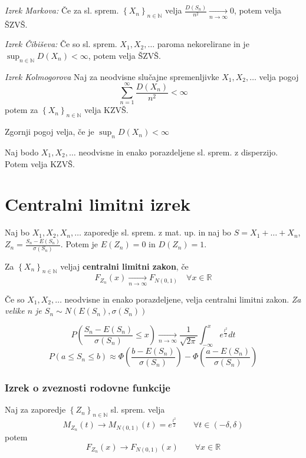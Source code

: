 \begin{multicols}{5}
\textit{Izrek Markova:}
Če za sl. sprem. $\left\{ X_n \right\}_{n \in \mathbb{N}} $ velja $\frac{D(S_n)}{n^2} \xrightarrow[n \to \infty]{} 0$, potem velja ŠZVŠ.

\textit{Izrek Čibiševa:}
Če so sl. sprem. $ X_1, X_2, \dots $ paroma nekorelirane in je $\sup_{n \in \mathbb{N}} D(X_n) < \infty$, potem velja ŠZVŠ.

\textit{Izrek Kolmogorova}
Naj za neodvisne slučajne spremenljivke $X_1, X_2, \dots$ velja pogoj
\[ \sum_{n=1}^\infty \frac{D(X_n)}{n^2} < \infty\]
potem za  $\left\{ X_n \right\}_{n \in \mathbb{N}} $ velja KZVŠ.

Zgornji pogoj velja, če je $\sup_n D(X_n) < \infty$

Naj bodo  $X_1, X_2, \dots$ neodvisne in enako porazdeljene sl. sprem. z disperzijo. Potem velja KZVŠ.

\section{Centralni limitni izrek}
Naj bo $X_1, X_2, X_n, \dots$ zaporedje sl. sprem. z mat. up. in naj bo $S = X_1 +\dots + X_n$, $Z_n = \frac{S_n - E(S_n)}{\sigma(S_n)}$. Potem je $E(Z_n) = 0$ in $D(Z_n) = 1$.

Za $\left\{ X_n \right\}_{n \in \mathbb{N}} $ veljaj \textbf{centralni limitni zakon}, če
\[ F_{Z_n}(x) \xrightarrow[n \to \infty]{} F_{N(0,1)}  \quad \forall x \in \mathbb{R}\]

Če so $X_1, X_2, \dots$ neodvisne in enako porazdeljene, velja centralni limitni zakon.
\textit{Za velike $n$ je $S_n \sim N(E(S_n), \sigma(S_n))$}

\[ P\left(\frac{S_n - E(S_n)}{\sigma(S_n)} \leq x \right) \xrightarrow[n \to \infty]{} \frac{1}{\sqrt{2\pi}} \int_{-\infty}^{x} e^{\frac{t^2}{2}} dt\]
\[ P(a \leq S_n \leq b) \approx \Phi\left(\frac{b-E(S_n)}{\sigma(S_n)}\right) - \Phi\left(\frac{a-E(S_n)}{\sigma(S_n)}\right)  \]


\subsubsection{Izrek o zveznosti rodovne funkcije}

Naj za zaporedje $\left\{ Z_n \right\}_{n \in \mathbb{N}} $ sl. sprem. velja
\[ M_{Z_n}(t) \to M_{N(0,1)}(t) = e^{\frac{t^2}{2}} \qquad \forall t \in (-\delta, \delta)\]
potem
\[ F_{Z_n}(x) \to F_{N(0,1)}(x)  \qquad \forall x \in \mathbb{R}\]



\end{multicols}
